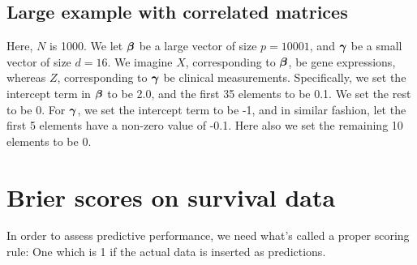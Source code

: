 \subsection{Large example with correlated matrices}
Here, $N$ is 1000. We let $\boldsymbol{\beta}$ be a large vector of size $p=10001$, and $\boldsymbol{\gamma}$ be a small vector of size $d=16$. We imagine $X$, corresponding to $\boldsymbol{\beta}$, be gene expressions, whereas $Z$, corresponding to $\boldsymbol{\gamma}$ be clinical measurements. Specifically, we set the intercept term in $\boldsymbol{\beta}$ to be 2.0, and the first 35 elements to be 0.1. We set the rest to be 0. For $\boldsymbol{\gamma}$, we set the intercept term to be -1, and in similar fashion, let the first 5 elements have a non-zero value of -0.1. Here also we set the remaining 10 elements to be 0.

\section{Brier scores on survival data}
In order to assess predictive performance, we need what's called a proper scoring rule: One which is 1 if the actual data is inserted as predictions.

